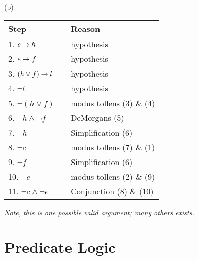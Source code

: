 \begin{questions}
\begin{solution}
  
  (b) 

  \begin{tabular}{lll}
        Step    & \hspace{0.2in} & Reason \\
        \hline
        1. $c \rightarrow h$                & & hypothesis \\
        2. $e \rightarrow f$           & & hypothesis \\
        3. $(h \vee f) \rightarrow l$            & & hypothesis \\
        4. $\neg l$ 				& & hypothesis \\
        5. $\neg (h \vee f)$   & & modus tollens (3) \& (4) \\
        6. $\neg h \wedge \neg f$       & & DeMorgans (5) \\
        7. $\neg h$               & & Simplification (6) \\
        8. $\neg c$          & & modus tollens (7) \& (1) \\
        9. $\neg f$       & & Simplification (6) \\
        10. $\neg e$  		& & modus tollens (2) \& (9) \\
        11. $\neg c \wedge \neg e$ 		 & & Conjunction (8) \& (10) \\
    \end{tabular}
    
    \emph{Note, this is one possible valid argument; many others exists.}

\end{solution}


\section*{Predicate Logic}




\end{questions}
